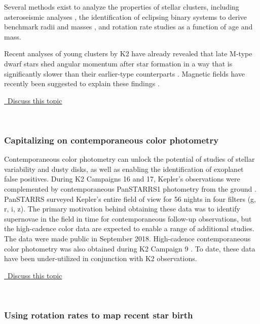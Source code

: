 \documentclass[modern]{aastex62}
\newcommand{\commentlink}[1]{\href{https://github.com/KeplerGO/ScientificOpportunities/issues/#1}{\sc \faExternalLink\ Discuss this topic}\,\,}
\begin{document}
Several methods exist to analyze the properties of stellar clusters, including asteroseismic analyses \citep[e.g.][]{stello2016}, the identification of eclipsing binary systems to derive benchmark radii and masses \citep[e.g.][]{gillen2017,kraus2017,sandquist2018,torres2018}, and rotation rate studies as a function of age and mass.

Recent analyses of young clusters by K2 have already revealed that late M-type dwarf stars shed angular momentum after star formation in a way that is significantly slower than their earlier-type counterparts \citep[e.g.][]{douglas2017,rebull2018}.
Magnetic fields have recently been suggested to explain these findings \citep{garraffo2018}.
\\
\begin{center}
\commentlink{13}
\end{center}
\ \\

\subsubsection{Capitalizing on contemporaneous color photometry}
Contemporaneous color photometry can unlock the potential of studies of stellar variability and dusty disks, as well as enabling the identification of exoplanet false positives. During K2 Campaigns 16 and 17, Kepler's observations were complemented by contemporaneous PanSTARRS1 photometry from the ground \citep{dotson2018}. PanSTARRS surveyed Kepler's entire field of view for 56 nights in four filters (g, r, i, z).
The primary motivation behind obtaining these data was to identify supernovae in the field in time for contemporaneous follow-up observations, but the high-cadence color data are expected to enable a range of additional studies. The data were made public in September 2018.  High-cadence contemporaneous color photometry was also obtained during K2 Campaign 9 \citep{henderson2016,zang2018}. To date, these data have been under-utilized in conjunction with K2 observations.
\\
\begin{center}
\commentlink{14}
\end{center}
\ \\

\subsubsection{Using rotation rates to map recent star birth}
\end{document}
